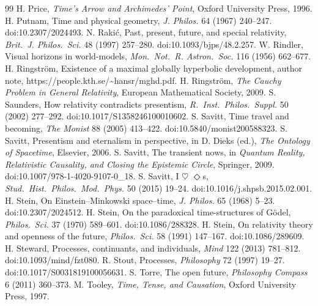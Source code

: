 \documentclass[11pt]{article}
\theoremstyle{definition}
\begin{document}
\begin{thebibliography}{99}
 H. Price, \emph{Time's Arrow and Archimedes' Point}, Oxford University Press, 1996.
 H. Putnam, Time and physical geometry, \emph{J. Philos.} 64 (1967) 240--247. doi:10.2307/2024493.
 N. Rakić, Past, present, future, and special relativity, \emph{Brit.\ J. Philos.\ Sci.} 48 (1997) 257--280. doi:10.1093/bjps/48.2.257.
 W. Rindler, Visual horizons in world-models, \emph{Mon.\ Not.\ R. Astron.\ Soc.} 116 (1956) 662--677.
 H. Ringström, Existence of a maximal globally hyperbolic development, author note, https://people.kth.se/\textasciitilde hansr/mghd.pdf.
 H. Ringström, \emph{The Cauchy Problem in General Relativity}, European Mathematical Society, 2009.
 S. Saunders, How relativity contradicts presentism, \emph{R.\ Inst.\ Philos.\ Suppl.} 50 (2002) 277--292. doi:10.1017/S1358246100010602.
 S. Savitt, Time travel and becoming, \emph{The Monist} 88 (2005) 413--422. doi:10.5840/monist200588323.
 S. Savitt, Presentism and eternalism in perspective, in D. Dieks (ed.), \emph{The Ontology of Spacetime}, Elsevier, 2006.
 S. Savitt, The transient nows, in \emph{Quantum Reality, Relativistic Causality, and Closing the Epistemic Circle}, Springer, 2009. doi:10.1007/978-1-4020-9107-0\_18.
 S. Savitt, I $\heartsuit$ $\Diamond$s, \emph{Stud.\ Hist.\ Philos.\ Mod.\ Phys.} 50 (2015) 19--24. doi:10.1016/j.shpsb.2015.02.001.
 H. Stein, On Einstein--Minkowski space--time, \emph{J. Philos.} 65 (1968) 5--23. doi:10.2307/2024512.
 H. Stein, On the paradoxical time-structures of Gödel, \emph{Philos.\ Sci.} 37 (1970) 589--601. doi:10.1086/288328.
 H. Stein, On relativity theory and openness of the future, \emph{Philos.\ Sci.} 58 (1991) 147--167. doi:10.1086/289609.
 H. Steward, Processes, continuants, and individuals, \emph{Mind} 122 (2013) 781--812. doi:10.1093/mind/fzt080.
 R. Stout, Processes, \emph{Philosophy} 72 (1997) 19--27. doi:10.1017/S0031819100056631.
 S. Torre, The open future, \emph{Philosophy Compass} 6 (2011) 360--373.
 M. Tooley, \emph{Time, Tense, and Causation}, Oxford University Press, 1997.

\end{thebibliography}
\end{document}
